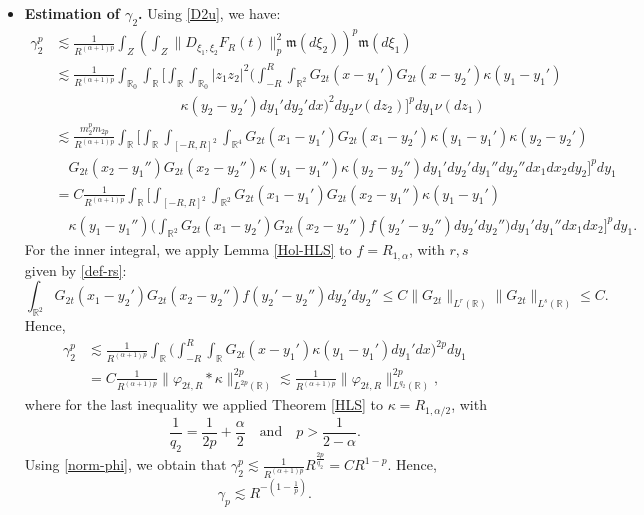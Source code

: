 \documentclass[12pt]{article}
\def\bR{\mathbb{R}}
\newcommand{\les}{\lesssim}
\def\k{\kappa}
\newcommand{\fm}{\mathfrak{m}}
\begin{document}
\begin{itemize}
\item {\bf Estimation of $\gamma_2$.} Using \eqref{D2u}, we have:
\begin{align*} 
\gamma_2^p & \les \frac{1}{R^{(\alpha+1)p}} \int_{Z} \left( \int_{Z} \|D_{\xi_1,\xi_2} F_R(t)\|_{p}^2 \fm(d\xi_2) \right)^p \fm(d\xi_1) \\
& \les  \frac{1}{R^{(\alpha+1)p}}  \int_{\bR_0}\int_{\bR} \Bigg[\int_{\bR} \int_{\bR_0} |z_1 z_2|^2 \Big(\int_{-R}^R \int_{\bR^2}
G_{2t}(x-y_1') G_{2t}(x-y_2') \k(y_1-y_1') \\
& \qquad \qquad \quad \qquad \qquad \k(y_2-y_2') dy_1'dy_2' dx \Big)^2 dy_2 \nu(dz_2)  \Bigg]^p dy_1 \nu(dz_1)  \\
& \les \frac{m_2^p m_{2p}}{R^{(\alpha+1)p}} \int_{\bR} \Bigg[ \int_{\bR} \int_{[-R,R]^2} \int_{\bR^4}
G_{2t}(x_1-y_1') G_{2t}(x_1-y_2')\k(y_1-y_1') \k(y_2-y_2')\\
& \quad G_{2t}(x_2-y_1'') G_{2t}(x_2-y_2'')\k(y_1-y_1'') \k(y_2-y_2'')dy_1'dy_2' dy_1'' dy_2'' dx_1 dx_2 dy_2 
\Bigg]^p dy_1 \\
& = C \frac{1}{R^{(\alpha+1)p}}  \int_{\bR} \Bigg[  \int_{[-R,R]^2} \int_{\bR^2} G_{2t}(x_1-y_1') G_{2t}(x_2-y_1'')
\k(y_1-y_1') \\
& \quad \k(y_1-y_1'') \Big(\int_{\bR^2} G_{2t}(x_1-y_2') G_{2t}(x_2-y_2'') f(y_2'-y_2'')dy_2' dy_2'' \Big)dy_1'  dy_1'' dx_1 dx_2 
\Bigg]^p dy_1.
\end{align*}
For the inner integral, we apply Lemma \ref{Hol-HLS} to $f=R_{1,\alpha}$, with $r,s$ given by \eqref{def-rs}:
\[
\int_{\bR^2} G_{2t}(x_1-y_2') G_{2t}(x_2-y_2'') f(y_2'-y_2'')dy_2' dy_2'' \leq C \|G_{2t}\|_{L^r(\bR)} \|G_{2t}\|_{L^s(\bR)} \leq C.
\]
Hence,
\begin{align*}
\gamma_2^p & \les \frac{1}{R^{(\alpha+1)p}} \int_{\bR} \Bigg(  \int_{-R}^R \int_{\bR} G_{2t}(x-y_1')
\k(y_1-y_1')dy_1'  dx \Bigg)^{2p} dy_1\\
& =C  \frac{1}{R^{(\alpha+1)p}}  \|\varphi_{2t,R}*\k\|_{L^{2p}(\bR)}^{2p} \les \frac{1}{R^{(\alpha+1)p}}  \|\varphi_{2t,R}\|_{L^{q_2}(\bR)}^{2p},
\end{align*}
where for the last inequality we applied Theorem \ref{HLS} to $\k=R_{1,\alpha/2}$, with
\begin{equation}
\label{def-q2}
\frac{1}{q_2}=\frac{1}{2p}+\frac{\alpha}{2} \quad \mbox{and} \quad p>\frac{1}{2-\alpha}.
\end{equation}
Using \eqref{norm-phi}, we obtain that 
$\gamma_2^p \les \frac{1}{R^{(\alpha+1)p}} R^{\frac{2p}{q_2}}=C R^{1-p}$. Hence,
\[
\gamma_p \les R^{-(1-\frac{1}{p})}.
\]


\end{itemize}
\end{document}
